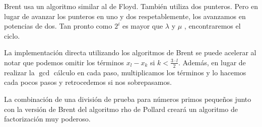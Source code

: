 Brent usa un algoritmo similar al de Floyd. También utiliza dos punteros. Pero en lugar de avanzar los punteros en uno y dos respetablemente, los avanzamos en potencias de dos. Tan pronto como $2^i$ es mayor que $\lambda$ y $\mu$ , encontraremos el ciclo.

La implementación directa utilizando los algoritmos de Brent se puede acelerar al notar que podemos 
omitir los términos $x_l - x_k$ si $k < \frac{3 \cdot l}{2}$. Además, en lugar de realizar la $\gcd$ cálculo en cada paso, multiplicamos los términos y lo hacemos cada pocos pasos y retrocedemos si nos 
sobrepasamos.

La combinación de una división de prueba para números primos pequeños junto con la versión de Brent del algoritmo rho de Pollard creará un algoritmo de factorización muy poderoso.